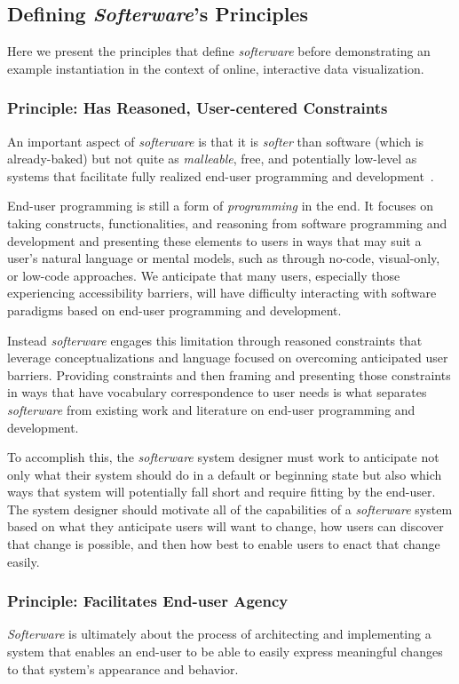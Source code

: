 \documentclass[12pt]{cmuthesis}
\begin{document}
\subsection{Defining \textit{Softerware}'s Principles}
Here we present the principles that define \textit{softerware} before demonstrating an example instantiation in the context of online, interactive data visualization.

\subsubsection{Principle: Has Reasoned, User-centered Constraints}
An important aspect of \textit{softerware} is that it is \textit{softer} than software (which is already-baked) but not quite as \textit{malleable}, free, and potentially low-level as systems that facilitate fully realized end-user programming and development~\cite{Ko, Cabitza}.

End-user programming is still a form of \textit{programming} in the end. It focuses on taking constructs, functionalities, and reasoning from software programming and development and presenting these elements to users in ways that may suit a user's natural language or mental models, such as through no-code, visual-only, or low-code approaches. We anticipate that many users, especially those experiencing accessibility barriers, will have difficulty interacting with software paradigms based on end-user programming and development.

Instead \textit{softerware} engages this limitation through reasoned constraints that leverage conceptualizations and language focused on overcoming anticipated user barriers. Providing constraints and then framing and presenting those constraints in ways that have vocabulary correspondence to user needs is what separates \textit{softerware} from existing work and literature on end-user programming and development.

To accomplish this, the \textit{softerware} system designer must work to anticipate not only what their system should do in a default or beginning state but also which ways that system will potentially fall short and require fitting by the end-user. The system designer should motivate all of the capabilities of a \textit{softerware} system based on what they anticipate users will want to change, how users can discover that change is possible, and then how best to enable users to enact that change easily.

\subsubsection{Principle: Facilitates End-user Agency}
\textit{Softerware} is ultimately about the process of architecting and implementing a system that enables an end-user to be able to easily express meaningful changes to that system's appearance and behavior.
\end{document}
